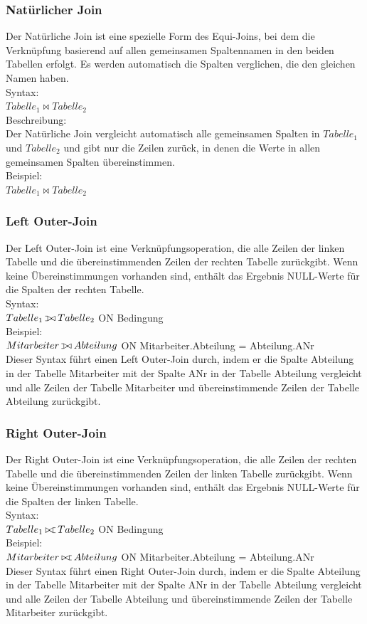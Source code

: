 \documentclass[12pt,a4paper]{article}
\def\ojoin{\setbox0=\hbox{$\bowtie$}%
  \rule[-.02ex]{.25em}{.4pt}\llap{\rule[\ht0]{.25em}{.4pt}}}
\def\leftouterjoin{\mathbin{\ojoin\mkern-5.8mu\bowtie}}
\def\rightouterjoin{\mathbin{\bowtie\mkern-5.8mu\ojoin}}
\begin{document}
		\subsubsection{Natürlicher Join}
			Der Natürliche Join ist eine spezielle Form des Equi-Joins, bei dem die Verknüpfung basierend auf allen gemeinsamen Spaltennamen in den beiden Tabellen erfolgt. Es werden automatisch die Spalten verglichen, die den gleichen Namen haben.\\
			Syntax:\\
			$Tabelle_1 \Join Tabelle_2$\\
			Beschreibung:\\
			Der Natürliche Join vergleicht automatisch alle gemeinsamen Spalten in $Tabelle_1$ und $Tabelle_2$ und gibt nur die Zeilen zurück, in denen die Werte in allen gemeinsamen Spalten übereinstimmen.\\
			Beispiel:\\
			$Tabelle_1 \Join Tabelle_2$

		\subsubsection{Left Outer-Join}
			Der Left Outer-Join ist eine Verknüpfungsoperation, die alle Zeilen der linken Tabelle und die übereinstimmenden Zeilen der rechten Tabelle zurückgibt. Wenn keine Übereinstimmungen vorhanden sind, enthält das Ergebnis NULL-Werte für die Spalten der rechten Tabelle.\\
			Syntax:\\
			$Tabelle_1 \leftouterjoin Tabelle_2$ ON Bedingung\\
			Beispiel:\\
			$Mitarbeiter \leftouterjoin Abteilung$ ON Mitarbeiter.Abteilung = Abteilung.ANr\\
			Dieser Syntax führt einen Left Outer-Join durch, indem er die Spalte Abteilung in der Tabelle Mitarbeiter mit der Spalte ANr in der Tabelle Abteilung vergleicht und alle Zeilen der Tabelle Mitarbeiter und übereinstimmende Zeilen der Tabelle Abteilung zurückgibt.
			
		\subsubsection{Right Outer-Join}
			Der Right Outer-Join ist eine Verknüpfungsoperation, die alle Zeilen der rechten Tabelle und die übereinstimmenden Zeilen der linken Tabelle zurückgibt. Wenn keine Übereinstimmungen vorhanden sind, enthält das Ergebnis NULL-Werte für die Spalten der linken Tabelle.\\
			Syntax:\\
			$Tabelle_1 \rightouterjoin Tabelle_2$ ON Bedingung\\
			Beispiel:\\
			$Mitarbeiter \rightouterjoin Abteilung$ ON Mitarbeiter.Abteilung = Abteilung.ANr\\
			Dieser Syntax führt einen Right Outer-Join durch, indem er die Spalte Abteilung in der Tabelle Mitarbeiter mit der Spalte ANr in der Tabelle Abteilung vergleicht und alle Zeilen der Tabelle Abteilung und übereinstimmende Zeilen der Tabelle Mitarbeiter zurückgibt.\\
\end{document}
